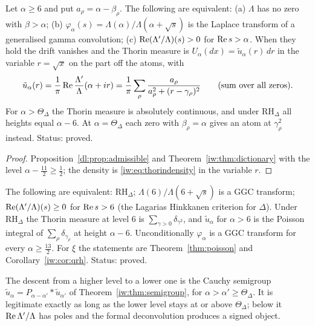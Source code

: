 \begin{theorem}\label{dl:thm:level}
Let $\alpha\ge6$ and put $a_\rho=\alpha-\beta_\rho$. The following are equivalent: (a) $\Lambda$ has no zero with $\beta>\alpha$; (b) $\varphi_\alpha(s)=\Lambda(\alpha)/\Lambda(\alpha+\sqrt s)$ is the Laplace transform of a generalised gamma convolution; (c) $\operatorname{Re}(\Lambda'/\Lambda)(s)>0$ for $\operatorname{Re} s>\alpha$. When they hold the drift vanishes and the Thorin measure is $U_\alpha(dx)=\tilde u_\alpha(r)\,dr$ in the variable $r=\sqrt x$ on the part off the atoms, with
\[
\tilde u_\alpha(r)=\frac1\pi\operatorname{Re}\frac{\Lambda'}\Lambda(\alpha+ir)=\frac1\pi\sum_\rho\frac{a_\rho}{a_\rho^2+(r-\gamma_\rho)^2}\qquad(\text{sum over all zeros}).
\]
For $\alpha>\Theta_\Delta$ the Thorin measure is absolutely continuous, and under $\mathrm{RH}_\Delta$ all heights equal $\alpha-6$. At $\alpha=\Theta_\Delta$ each zero with $\beta_\rho=\alpha$ gives an atom at $\gamma_\rho^2$ instead. Status: proved.
\end{theorem}

\begin{proof}
Proposition~\ref{dl:prop:admissible} and Theorem~\ref{iw:thm:dictionary} with the level $\alpha-\frac{11}2\ge\frac12$; the density is \eqref{iw:eq:thorindensity} in the variable $r$.
\end{proof}

\begin{corollary}\label{dl:cor:rh}
The following are equivalent: $\mathrm{RH}_\Delta$; $\Lambda(6)/\Lambda(6+\sqrt s)$ is a GGC transform; $\operatorname{Re}(\Lambda'/\Lambda)(s)\ge0$ for $\operatorname{Re} s>6$ (the Lagarias Hinkkanen criterion \cite{Lagarias} for $\Delta$). Under $\mathrm{RH}_\Delta$ the Thorin measure at level $6$ is $\sum_{\gamma>0}\delta_{\gamma^2}$, and $\tilde u_\alpha$ for $\alpha>6$ is the Poisson integral of $\sum_\rho\delta_{\gamma_\rho}$ at height $\alpha-6$. Unconditionally $\varphi_\alpha$ is a GGC transform for every $\alpha\ge\frac{13}2$. For $\xi$ the statements are Theorem~\ref{thm:poisson} and Corollary~\ref{iw:cor:qrh}. Status: proved.
\end{corollary}

The descent from a higher level to a lower one is the Cauchy semigroup $\tilde u_\alpha=P_{\alpha-\alpha'}*\tilde u_{\alpha'}$ of Theorem~\ref{iw:thm:semigroup}, for $\alpha>\alpha'\ge\Theta_\Delta$. It is legitimate exactly as long as the lower level stays at or above $\Theta_\Delta$; below it $\operatorname{Re}\Lambda'/\Lambda$ has poles and the formal deconvolution produces a signed object.

